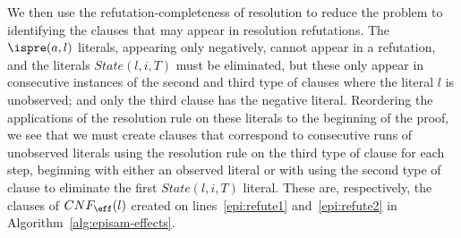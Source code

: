 We then use the refutation-completeness of resolution to reduce the problem to identifying the clauses that may appear in resolution refutations. The $\ispre(a,l)$ literals, appearing only negatively, cannot appear in a refutation, and the literals $State(l,i,T)$ must be eliminated, but these only appear in consecutive instances of the second and third type of clauses where the literal $l$ is unobserved; and only the third clause has the negative literal. Reordering the applications of the resolution rule on these literals to the beginning of the proof, we see that we must create clauses that correspond to consecutive runs of unobserved literals using the resolution rule on the third type of clause for each step, beginning with either an observed literal or with using the second type of clause to eliminate the first $State(l,i,T)$ literal. These are, respectively, the clauses of $CNF_{\eff}(l)$ created on lines~\ref{epi:refute1} and~\ref{epi:refute2} in Algorithm~\ref{alg:episam-effects}. %

